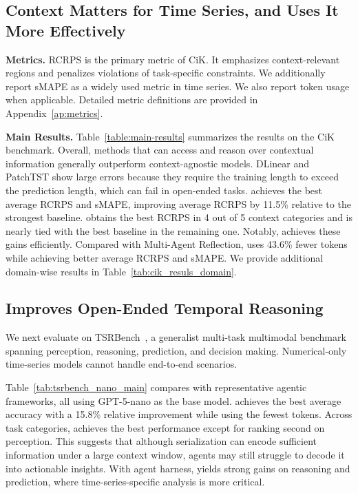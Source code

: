 \subsection{Context Matters for Time Series, and \method Uses It More Effectively}

\noindent\textbf{Metrics.}
RCRPS is the primary metric of CiK. It emphasizes context-relevant regions and penalizes violations of task-specific constraints. We additionally report sMAPE as a widely used metric in time series. We also report token usage when applicable. Detailed metric definitions are provided in Appendix~\ref{ap:metrics}.

\noindent\textbf{Main Results.}
Table~\ref{table:main-results} summarizes the results on the CiK benchmark. Overall, methods that can access and reason over contextual information generally outperform context-agnostic models. DLinear and PatchTST show large errors because they require the training length to exceed the prediction length, which can fail in open-ended tasks.
\method achieves the best average RCRPS and sMAPE, improving average RCRPS by 11.5\% relative to the strongest baseline. \method obtains the best RCRPS in 4 out of 5 context categories and is nearly tied with the best baseline in the remaining one. Notably, \method achieves these gains efficiently. Compared with Multi-Agent Reflection, \method uses 43.6\% fewer tokens while achieving better average RCRPS and sMAPE. We provide additional domain-wise results in Table~\ref{tab:cik_resuls_domain}.


\subsection{\method Improves Open-Ended Temporal Reasoning}


We next evaluate \method on TSRBench~\citep{DBLP:journals/corr/abs-2601-18744}, a generalist multi-task multimodal benchmark spanning perception, reasoning, prediction, and decision making. Numerical-only time-series models cannot handle end-to-end scenarios.

Table~\ref{tab:tsrbench_nano_main} compares \method with representative agentic frameworks, all using GPT-5-nano as the base model. \method achieves the best average accuracy with a 15.8\% relative improvement while using the fewest tokens.
Across task categories, \method achieves the best performance except for ranking second on perception. This suggests that although serialization can encode sufficient information under a large context window, agents may still struggle to decode it into actionable insights. With agent harness, \method yields strong gains on reasoning and prediction, where time-series-specific analysis is more critical.

